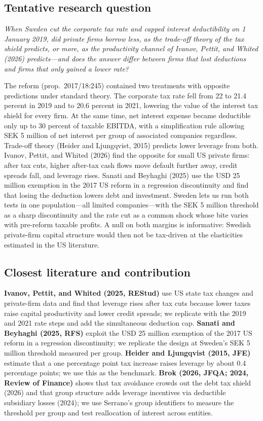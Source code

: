 \documentclass[12pt,a4paper]{article}
\begin{document}
\subsection{Tentative research question}

\emph{When Sweden cut the corporate tax rate and capped interest deductibility on 1 January 2019, did private firms borrow less, as the trade-off theory of the tax shield predicts, or more, as the productivity channel of Ivanov, Pettit, and Whited (2026) predicts---and does the answer differ between firms that lost deductions and firms that only gained a lower rate?}

The reform (prop.\ 2017/18:245) contained two treatments with opposite predictions under standard theory. The corporate tax rate fell from 22 to 21.4 percent in 2019 and to 20.6 percent in 2021, lowering the value of the interest tax shield for every firm. At the same time, net interest expense became deductible only up to 30 percent of taxable EBITDA, with a simplification rule allowing SEK 5 million of net interest per group of associated companies regardless. Trade-off theory (Heider and Ljungqvist, 2015) predicts lower leverage from both. Ivanov, Pettit, and Whited (2026) find the opposite for small US private firms: after tax cuts, higher after-tax cash flows move default further away, credit spreads fall, and leverage rises. Sanati and Beyhaghi (2025) use the USD 25 million exemption in the 2017 US reform in a regression discontinuity and find that losing the deduction lowers debt and investment. Sweden lets us run both tests in one population---all limited companies---with the SEK 5 million threshold as a sharp discontinuity and the rate cut as a common shock whose bite varies with pre-reform taxable profits. A null on both margins is informative: Swedish private-firm capital structure would then not be tax-driven at the elasticities estimated in the US literature.

\subsection{Closest literature and contribution}

\textbf{Ivanov, Pettit, and Whited (2025, REStud)} use US state tax changes and private-firm data and find that leverage rises after tax cuts because lower taxes raise capital productivity and lower credit spreads; we replicate with the 2019 and 2021 rate steps and add the simultaneous deduction cap. \textbf{Sanati and Beyhaghi (2025, RFS)} exploit the USD 25 million exemption of the 2017 US reform in a regression discontinuity; we replicate the design at Sweden's SEK 5 million threshold measured per group. \textbf{Heider and Ljungqvist (2015, JFE)} estimate that a one percentage point tax increase raises leverage by about 0.4 percentage points; we use this as the benchmark. \textbf{Brok (2026, JFQA; 2024, Review of Finance)} shows that tax avoidance crowds out the debt tax shield (2026) and that group structure adds leverage incentives via deductible subsidiary losses (2024); we use Serrano's group identifiers to measure the threshold per group and test reallocation of interest across entities.
\end{document}
